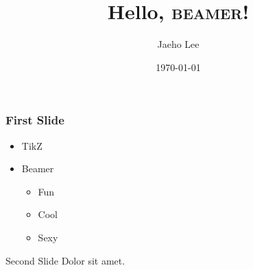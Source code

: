 \documentclass{beamer}
\title{Hello, \textsc{beamer}!}
\author{Jaeho Lee}
\date{\today}
\begin{document}
\maketitle
\begin{frame}
  \frametitle{First Slide}
  \begin{itemize}
    \item TikZ
    \item Beamer
      \begin{itemize}
        \item Fun
        \item Cool
        \item Sexy
      \end{itemize}
  \end{itemize}
\end{frame}
\begin{frame}{Second Slide}
  Dolor sit amet.
\end{frame}
\end{document}
